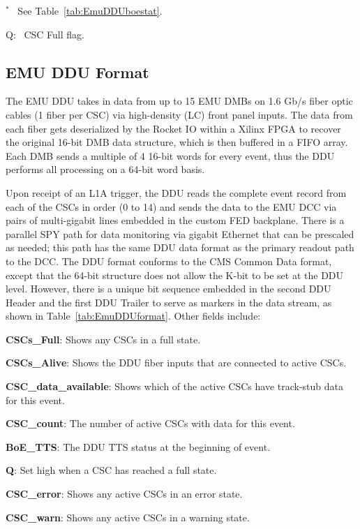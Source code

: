 \begin{landscape}
$^*$ \, See Table~\ref{tab:EmuDDUboestat}. 

Q: \, CSC Full flag.
\end{landscape}

\subsection{EMU DDU Format}
The EMU DDU takes in data from up to 15 EMU DMBs on 1.6 Gb/s fiber
optic cables (1 fiber per CSC) via high-density (LC) front panel inputs.
The data from each fiber gets deserialized by the Rocket IO within a Xilinx
FPGA to recover the original 16-bit DMB data structure, which is then
buffered in a FIFO array.  Each DMB sends a multiple of 4 16-bit words
for every event, thus the DDU performs all processing on a 64-bit word basis.

Upon receipt of an L1A trigger, the DDU
reads the complete event record from each of the CSCs in
order (0 to 14) and sends the data
to the EMU DCC via pairs of multi-gigabit lines embedded in
the custom FED backplane.
There is a parallel SPY path for data monitoring via gigabit Ethernet
that can be prescaled as needed;
this path has the same DDU data format as the primary
readout path to the DCC.
The DDU format conforms to the CMS Common Data format, except that
the 64-bit structure does not allow the K-bit to be
set at the DDU level.  However, there is a unique bit sequence embedded
in the second DDU Header and the first DDU Trailer to serve as markers
in the data stream, as shown in Table~\ref{tab:EmuDDUformat}.  Other fields
include:
\begin{description}
\item {\bf CSCs\_Full}: Shows any CSCs in a full state.
\item {\bf CSCs\_Alive}: Shows the DDU fiber inputs that are connected to active CSCs.
\item {\bf CSC\_data\_available}: Shows which of the active CSCs have
track-stub data for this event.
\item {\bf CSC\_count}: The number of active CSCs with data for this event.
\item {\bf BoE\_TTS}: The DDU TTS status at the beginning of event.
\item {\bf Q}: Set high when a CSC has reached a full state.
\item {\bf CSC\_error}: Shows any active CSCs in an error state.
\item {\bf CSC\_warn}: Shows any active CSCs in a warning state.
\end{description}

